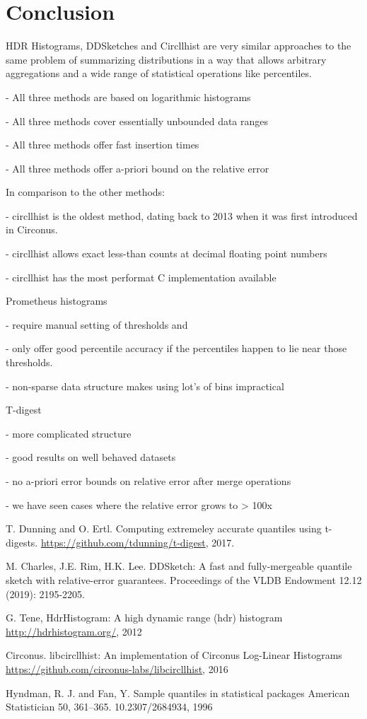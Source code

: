\documentclass{article}
\theoremstyle{plain}
\theoremstyle{remark}
\begin{document}
\section{Conclusion}

HDR Histograms, DDSketches and Circllhist are very similar approaches to the same problem of
summarizing distributions in a way that allows arbitrary aggregations and a wide range of
statistical operations like percentiles.

- All three methods are based on logarithmic histograms

- All three methods cover essentially unbounded data ranges

- All three methods offer fast insertion times

- All three methods offer a-priori bound on the relative error

In comparison to the other methods:

- circllhist is the oldest method, dating back to 2013 when it was first introduced in Circonus.

- circllhist allows exact less-than counts at decimal floating point numbers

- circllhist has the most performat C implementation available

Prometheus histograms

- require manual setting of thresholds and

- only offer good percentile accuracy if the percentiles happen to lie near those thresholds.

- non-sparse data structure makes using lot's of bins impractical

T-digest

- more complicated structure

- good results on well behaved datasets

- no a-priori error bounds on relative error after merge operations

- we have seen cases where the relative error grows to > 100x



\begin{thebibliography}{1}

T. Dunning and O. Ertl.
\newblock  Computing extremeley accurate quantiles using t-digests.
\newblock \url{https://github.com/tdunning/t-digest}, 2017.

M. Charles, J.E. Rim, H.K. Lee.
\newblock DDSketch: A fast and fully-mergeable quantile sketch with relative-error guarantees.
\newblock Proceedings of the VLDB Endowment 12.12 (2019): 2195-2205.

G. Tene,
\newblock HdrHistogram: A high dynamic range (hdr) histogram
\newblock \url{http://hdrhistogram.org/}, 2012

  Circonus.
  \newblock libcircllhist: An implementation of Circonus Log-Linear Histograms
  \newblock \url{https://github.com/circonus-labs/libcircllhist}, 2016

  Hyndman, R. J. and Fan, Y.
  \newbloack Sample quantiles in statistical packages
  \newblock American Statistician 50, 361–365. 10.2307/2684934, 1996

\end{thebibliography}
\end{document}

